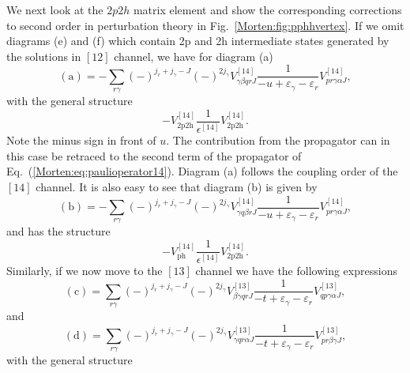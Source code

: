 We next look at the $2p2h$ matrix element and show the
corresponding corrections to second order in perturbation
theory in Fig.~\ref{Morten:fig:pphhvertex}.
If we omit diagrams (e) and (f) which contain 2p and 2h 
intermediate states generated by the solutions
in $[12]$ channel, we have 
for diagram (a)
\begin{equation}
      \mathrm{(a)}=-\sum_{r\gamma}(-)^{j_r+j_{\gamma}-J}
      (-)^{2j_{\gamma}}
      V^{[14]}_{\gamma\beta qr J}
      \frac{1}{-u+\varepsilon_{\gamma}-
                \varepsilon_{r}} V^{[14]}_{pr\gamma\alpha J},
       \label{Morten:eq:2p2ha}
\end{equation}
with the general structure
\begin{equation}
    -V_{\mathrm{2p2h}}^{[14]}
     \frac{1}{\epsilon^{[14]}}
     V_{\mathrm{2p2h}}^{[14]}.
\end{equation}
Note  the minus sign in front of $u$. The contribution from the 
propagator can in this case be retraced to the second
term of the propagator of Eq.~(\ref{Morten:eq:paulioperator14}).
Diagram (a) follows the coupling order of the $[14]$ channel.
It is also easy to see that diagram (b) is given by
\begin{equation}
      \mathrm{(b)}=-\sum_{r\gamma}(-)^{j_r+j_{\gamma}-J}
      (-)^{2j_{\gamma}}
      V^{[14]}_{\gamma q \beta r J}
      \frac{1}{-u+\varepsilon_{\gamma}-
                \varepsilon_{r}} V^{[14]}_{pr\gamma\alpha J},
       \label{Morten:eq:2p2hb}
\end{equation}
and has the structure
\begin{equation}
    -V_{\mathrm{ph}}^{[14]}
     \frac{1}{\epsilon^{[14]}}
     V_{\mathrm{2p2h}}^{[14]}.
\end{equation}
Similarly, if we now move to the $[13]$ channel we have 
the following expressions
\begin{equation}
      \mathrm{(c)}=\sum_{r\gamma}(-)^{j_r+j_{\gamma}-J}
      (-)^{2j_{\gamma}}
      V^{[13]}_{\beta\gamma qr J}
      \frac{1}{-t+\varepsilon_{\gamma}-
                \varepsilon_{r}} V^{[13]}_{qp\gamma\alpha J},
       \label{Morten:eq:2p2hc}
\end{equation}
and 
\begin{equation}
      \mathrm{(d)}=\sum_{r\gamma}(-)^{j_r+j_{\gamma}-J}
      (-)^{2j_{\gamma}}
      V^{[13]}_{\gamma q r\alpha J}
      \frac{1}{-t+\varepsilon_{\gamma}-
                \varepsilon_{r}} V^{[13]}_{pr\beta\gamma J},
       \label{Morten:eq:2p2hd}
\end{equation}
with the general structure
